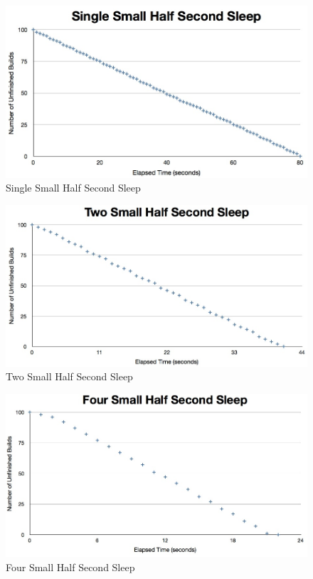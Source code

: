 \documentclass{scrartcl}
\begin{document}
\begin{figure}[h!]
  \begin{center}
    \includegraphics[scale=0.45]{raw_data/sleep0.5/one_small/graph.jpg}
  \end{center}
  \caption{Single Small Half Second Sleep}
  \label{fig:sleephalf_one_small_queuelength}
\end{figure}

\begin{figure}[h!]
  \begin{center}
    \includegraphics[scale=0.45]{raw_data/sleep0.5/two_small/graph.jpg}
  \end{center}
  \caption{Two Small Half Second Sleep}
  \label{fig:sleephalf_two_small_queuelength}
\end{figure}

\begin{figure}[h!]
  \begin{center}
    \includegraphics[scale=0.45]{raw_data/sleep0.5/four_small/graph.jpg}
  \end{center}
  \caption{Four Small Half Second Sleep}
  \label{fig:sleephalf_four_small_queuelength}
\end{figure}
\end{document}
